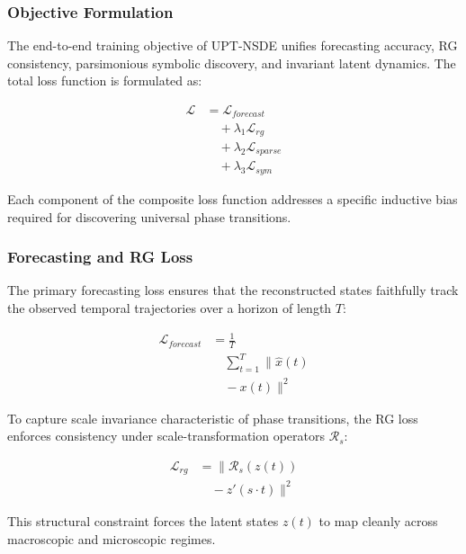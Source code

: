 \documentclass[10pt,twocolumn]{article}
\begin{document}
\subsubsection{Objective Formulation}
The end-to-end training
objective of UPT-NSDE
unifies forecasting
accuracy, RG consistency,
parsimonious symbolic
discovery, and invariant
latent dynamics. The
total loss function is
formulated as:

\begin{equation}
\begin{aligned}
\mathcal{L} &= \mathcal{L}_{forecast} \\
&\quad + \lambda_1 \mathcal{L}_{rg} \\
&\quad + \lambda_2 \mathcal{L}_{sparse} \\
&\quad + \lambda_3 \mathcal{L}_{sym}
\end{aligned}
\end{equation}

Each component of the
composite loss function
addresses a specific
inductive bias required
for discovering universal
phase transitions.

\subsubsection{Forecasting and RG Loss}
The primary forecasting
loss ensures that the
reconstructed states
faithfully track the
observed temporal
trajectories over a
horizon of length $T$:

\begin{equation}
\begin{aligned}
\mathcal{L}_{forecast} &= \frac{1}{T} \\
&\quad \sum_{t=1}^{T}
\| \hat{x}(t) \\
&\quad - x(t) \|^2
\end{aligned}
\end{equation}

To capture scale invariance
characteristic of phase
transitions, the RG loss
enforces consistency
under scale-transformation
operators $\mathcal{R}_s$:

\begin{equation}
\begin{aligned}
\mathcal{L}_{rg} &=
\| \mathcal{R}_s(z(t)) \\
&\quad - z'(s \cdot t) \|^2
\end{aligned}
\end{equation}

This structural constraint
forces the latent states
$z(t)$ to map cleanly
across macroscopic and
microscopic regimes.
\end{document}

